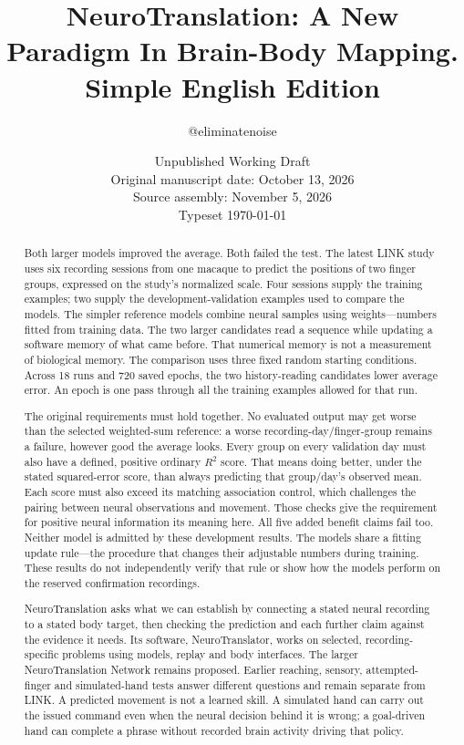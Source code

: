 \documentclass[11pt,a4paper]{article}
\renewcommand{\_}{\char95\relax}
\begin{document}
\title{NeuroTranslation: A New Paradigm In Brain-Body Mapping.\\[.4em]\large Simple English Edition}
\author{@eliminatenoise}
\date{Unpublished Working Draft\\Original manuscript date: October 13, 2026\\Source assembly: November 5, 2026\\Typeset \today}
\maketitle

\begin{abstract}
Both larger models improved the average. Both failed the test. The latest LINK study uses six recording sessions from one macaque to predict the positions of two finger groups, expressed on the study's normalized scale. Four sessions supply the training examples; two supply the development-validation examples used to compare the models. The simpler reference models combine neural samples using weights---numbers fitted from training data. The two larger candidates read a sequence while updating a software memory of what came before. That numerical memory is not a measurement of biological memory. The comparison uses three fixed random starting conditions. Across 18 runs and 720 saved epochs, the two history-reading candidates lower average error. An epoch is one pass through all the training examples allowed for that run.

The original requirements must hold together. No evaluated output may get worse than the selected weighted-sum reference: a worse recording-day/finger-group remains a failure, however good the average looks. Every group on every validation day must also have a defined, positive ordinary $R^2$ score. That means doing better, under the stated squared-error score, than always predicting that group/day's observed mean. Each score must also exceed its matching association control, which challenges the pairing between neural observations and movement. Those checks give the requirement for positive neural information its meaning here. All five added benefit claims fail too. Neither model is admitted by these development results. The models share a fitting update rule---the procedure that changes their adjustable numbers during training. These results do not independently verify that rule or show how the models perform on the reserved confirmation recordings.

NeuroTranslation asks what we can establish by connecting a stated neural recording to a stated body target, then checking the prediction and each further claim against the evidence it needs. Its software, NeuroTranslator, works on selected, recording-specific problems using models, replay and body interfaces. The larger NeuroTranslation Network remains proposed. Earlier reaching, sensory, attempted-finger and simulated-hand tests answer different questions and remain separate from LINK. A predicted movement is not a learned skill. A simulated hand can carry out the issued command even when the neural decision behind it is wrong; a goal-driven hand can complete a phrase without recorded brain activity driving that policy.


\end{abstract}
\end{document}

